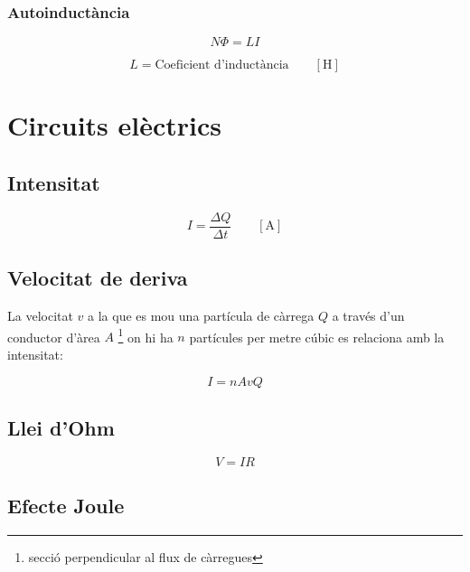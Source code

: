 \subsubsection{Autoinductància}
\label{ssub:autoinductancia}

\begin{equation}
    N\Phi = LI
\end{equation}

\begin{equation}
    L = \text{Coeficient d'inductància} \qquad \left[ \si{\henry} \right]
\end{equation}

\section{Circuits elèctrics}
\label{sec:circuits_electrics}


\subsection{Intensitat}
\label{sub:intensitat_circuit}

\begin{equation}
    I = \frac{\Delta Q}{\Delta t} \qquad \left[\si{\ampere}\right]
\end{equation}

\subsection{Velocitat de deriva}
\label{sub:velocitat_de_deriva}
La velocitat $v$ a la que es mou una partícula de càrrega $Q$ a través d'un
conductor d'àrea $A$ \footnote{secció perpendicular al flux de càrregues} on
hi ha $n$ partícules per metre cúbic es relaciona amb la intensitat:

\begin{equation}
    I = nAvQ
\end{equation}

\subsection{Llei d'Ohm}
\label{sub:llei_d_ohm}

\begin{equation}
    V = IR
\end{equation}

\subsection{Efecte Joule}
\label{sub:efecte_joule}

